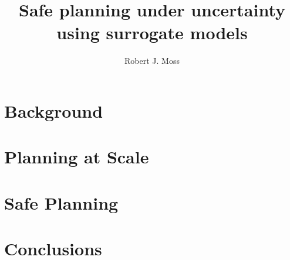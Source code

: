 \documentclass[11pt,letterpaper]{report}
\title{Safe planning under uncertainty\\using surrogate models}
\author{Robert J. Moss}
\begin{document}
\beforepreface


\afterpreface

\part{Background}\label{part:background}




\part{Planning at Scale}\label{part:planning}




\part{Safe Planning}\label{part:safety}



\part{Conclusions}\label{part:conclusions}




\cleardoublepage
{}
{}
\printbibliography
\end{document}
